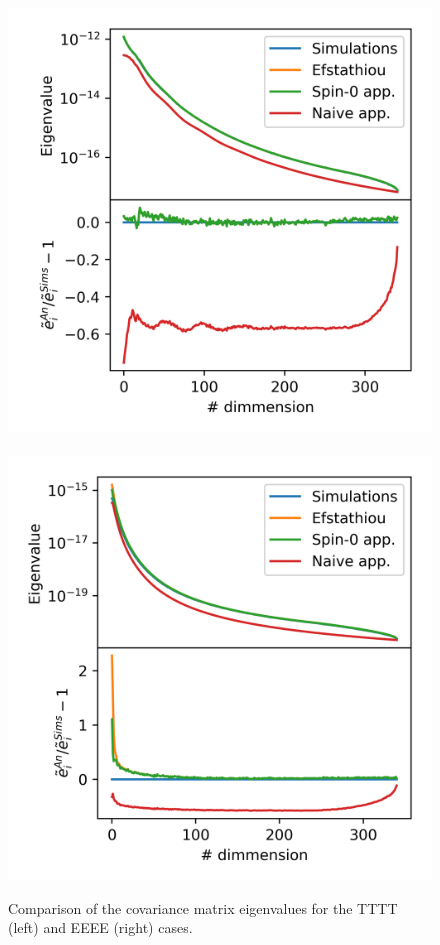 \documentclass[useAMS,usenatbib]{mn2e}
\begin{document}
\begin{figure} %
  \centering
  \includegraphics[width=\columnwidth]{./figures/run_sph_ALL_TTTT_reldev_eigval.png}~
  \includegraphics[width=\columnwidth]{./figures/run_sph_ALL_EEEE_reldev_eigval.png}
  \caption{Comparison of the covariance matrix eigenvalues for the TTTT (left)
    and EEEE (right) cases.} 
  \label{fig:TTTT_EEEE_eigv}
\end{figure}
\end{document}
